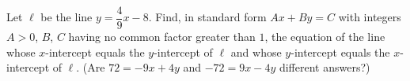 Let $\ell$ be the line $y=\dfrac{4}{9}x-8$. Find, in standard form $Ax+By=C$ with integers $A>0$, $B$, $C$ having no common factor greater than $1$, the equation of the line whose $x$-intercept equals the $y$-intercept of $\ell$ and whose $y$-intercept equals the $x$-intercept of $\ell$. (Are $72=-9x+4y$ and $-72=9x-4y$ different answers?)
